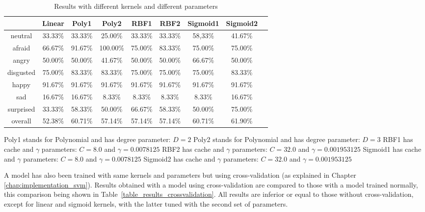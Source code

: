 \begin{table}[h]
   \caption{\label{table_results_kernels} Results with different kernels and different parameters}
\begin{tabular}{|c|c|c|c|c|c|c|c|c|}
  \hline
    & Linear & Poly1 & Poly2 & RBF1 & RBF2 & Sigmoid1 & Sigmoid2 \\
  \hline
  neutral & 33.33\% & 33.33\% & 25.00\% & 33.33\% & 33.33\% & 58,33\% & 41.67\% \\
  afraid & 66.67\% & 91.67\% & 100.00\% & 75.00\% & 83.33\% & 75.00\% & 75.00\% \\
  angry & 50.00\% & 50.00\% & 41.67\% & 50.00\% & 50.00\% & 66.67\% & 50.00\% \\
  disgusted & 75.00\% & 83.33\% & 83.33\% & 75.00\% & 75.00\% & 75.00\% & 83.33\% \\
  happy & 91.67\% & 91.67\% & 91.67\% & 91.67\% & 91.67\% & 91.67\% & 91.67\% \\
  sad & 16.67\% & 16.67\% & 8.33\% & 8.33\% & 8.33\% & 8.33\% & 16.67\% \\
  surprised & 33.33\% & 58.33\% & 50.00\% & 66.67\% & 58.33\% & 50.00\% & 75.00\% \\
  overall & 52.38\% & 60.71\% & 57.14\% & 57.14\% & 57.14\% & 60.71\% & 61.90\% \\
  \hline
\end{tabular}
\end{table}

\noindent Poly1 stands for Polynomial and has degree parameter: $ D = 2 $
\newline
\noindent Poly2 stands for Polynomial and has degree parameter: $ D = 3 $
\newline
\noindent RBF1 has cache and $\gamma$ parameters: $ C = 8.0 $ and $ \gamma = 0.0078125 $
\newline
\noindent RBF2 has cache and $\gamma$ parameters: $ C = 32.0 $ and $ \gamma = 0.001953125 $ 
\newline
\noindent Sigmoid1 has cache and $\gamma$ parameters: $ C = 8.0 $ and $ \gamma = 0.0078125 $
\newline
\noindent Sigmoid2 has cache and $\gamma$ parameters: $ C = 32.0 $ and $ \gamma = 0.001953125 $
\newline

\noindent A model has also been trained with same kernels and parameters but using cross-validation (as explained in Chapter \ref{chap:implementation_svm}). Results obtained with a model using cross-validation are compared to those with a model trained normally, this comparison being shown in  Table~\ref{table_results_crossvalidation}. All results are inferior or equal to those without cross-validation, except for linear and sigmoid kernels, with the latter tuned with the second set of parameters. 
\newline

